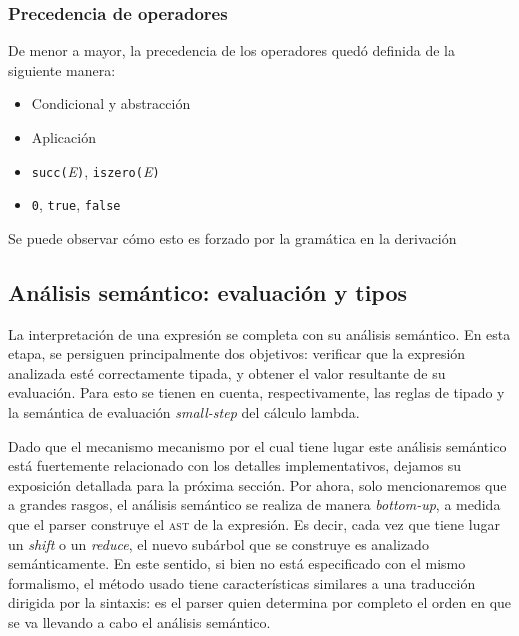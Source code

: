 \documentclass[11pt]{article}
\begin{document}
\subsubsection{Precedencia de operadores}

De menor a mayor, la precedencia de los operadores quedó definida de la
siguiente manera:

\begin{itemize}
  \item Condicional y abstracción
  \item Aplicación
  \item \verb|succ(|\emph{E}\verb|)|, \verb|iszero(|\emph{E}\verb|)|
  \item \verb|0|, \verb|true|, \verb|false|
\end{itemize}

Se puede observar cómo esto es forzado por la gramática en la derivación

\Tree [.E ]

\subsection{Análisis semántico: evaluación y tipos}

La interpretación de una expresión se completa con su análisis semántico.
En esta etapa, se persiguen principalmente dos objetivos: verificar que la
expresión analizada esté correctamente tipada, y obtener el valor resultante
de su evaluación. Para esto se tienen en cuenta, respectivamente, las reglas
de tipado y la semántica de evaluación \emph{small-step} del cálculo lambda.

Dado que el mecanismo mecanismo por el cual tiene lugar este análisis
semántico está fuertemente relacionado con los detalles implementativos,
dejamos su exposición detallada para la próxima sección.
Por ahora, solo mencionaremos que a grandes rasgos, el análisis semántico se
realiza de manera \emph{bottom-up}, a medida que el parser construye el
\textsc{ast} de la expresión.
Es decir, cada vez que tiene lugar un \emph{shift} o un \emph{reduce},
el nuevo subárbol que se construye es analizado semánticamente.
En este sentido, si bien no está especificado con el mismo formalismo, el
método usado tiene características similares a una traducción dirigida por la
sintaxis: es el parser quien determina por completo el orden en que
se va llevando a cabo el análisis semántico.

\end{document}
